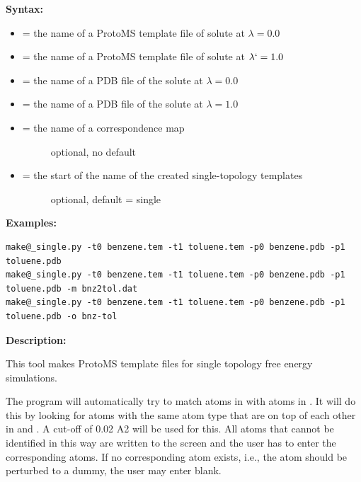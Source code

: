 \documentclass[letterpaper,10pt,english]{manual}
\begin{document}
\textbf{Syntax:}

\begin{itemize}
\item {} 
 = the name of a ProtoMS template file of solute at $\lambda=0.0$

\item {} 
 = the name of a ProtoMS template file of solute at $\lambda`=1.0$

\item {} 
 = the name of a PDB file of the solute at $\lambda=0.0$

\item {} 
 = the name of a PDB file of the solute at $\lambda=1.0$

\item {} \begin{description}
\item[{ = the name of a correspondence map}] \leavevmode
optional, no default

\end{description}

\item {} \begin{description}
\item[{ = the start of the name of the created single-topology templates}] \leavevmode
optional, default = single

\end{description}

\end{itemize}

\textbf{Examples:}

\begin{Verbatim}[commandchars=@\[\]]
make@_single.py -t0 benzene.tem -t1 toluene.tem -p0 benzene.pdb -p1 toluene.pdb
make@_single.py -t0 benzene.tem -t1 toluene.tem -p0 benzene.pdb -p1 toluene.pdb -m bnz2tol.dat
make@_single.py -t0 benzene.tem -t1 toluene.tem -p0 benzene.pdb -p1 toluene.pdb -o bnz-tol
\end{Verbatim}

\textbf{Description:}

This tool makes ProtoMS template files for single topology free energy simulations.

The program will automatically try to match atoms in  with atoms in . It will do this by looking for atoms with the same atom type that are on top of each other in  and . A cut-off of 0.02 A2 will be used for this. All atoms that cannot be identified in this way are written to the screen and the user has to enter the corresponding atoms. If no corresponding atom exists, i.e., the atom should be perturbed to a dummy, the user may enter blank.
\end{document}
